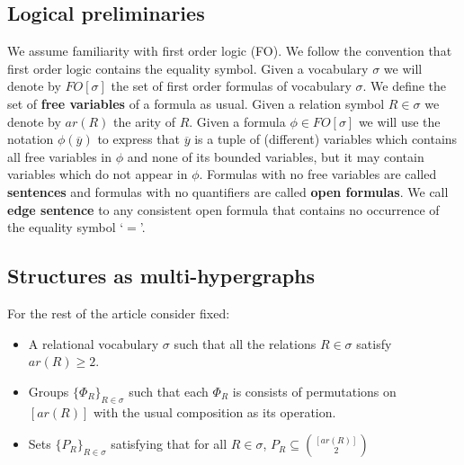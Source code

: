 \documentclass[12pt,notitlepage,a4paper]{article}
\theoremstyle{definition}
\begin{document}
\subsection{Logical preliminaries}
We assume familiarity with first order logic (FO). We follow 
the convention that first order logic contains the equality symbol. 
Given a vocabulary $\sigma$ we will denote by $FO[\sigma]$ the set of 
first order formulas of vocabulary $\sigma$. We define the set of 
\textbf{free variables} of a formula as usual. 
Given a relation symbol $R\in \sigma$ we denote by $ar(R)$ the arity of $R$. 
Given a formula $\phi\in FO[\sigma]$ we will use the notation $\phi(\overline{y})$ 
to express that $\overline{y}$ is a tuple of 
(different) variables which contains all free variables in $\phi$ and
none of its bounded variables, but it may contain variables
which do not appear in $\phi$.
Formulas with no free variables are called \textbf{sentences} and 
formulas with no quantifiers are called \textbf{open formulas}. 
We call \textbf{edge sentence} to any consistent open formula that contains
no occurrence of the equality symbol `$=$'.




\subsection{Structures as multi-hypergraphs} \label{sect:structures}

For the rest of the article consider fixed:
\begin{itemize}
	\item A relational vocabulary $\sigma$ such 
	that all the relations $R\in\sigma$ satisfy $ar(R)\geq 2$. 
	\item 
	Groups $\{ \Phi_R \}_{R\in \sigma}$
	such that each $\Phi_R$ is consists of 
	permutations on $[ar(R)]$ with the usual 
	composition as its operation.	
	\item 
	Sets $\{P_R\}_{R\in \sigma}$ satisfying that for 
	all $R\in \sigma$, 
	$P_R\subseteq \binom{[ar(R)]}{2}$
	
	
\end{itemize}
%

\end{document}
